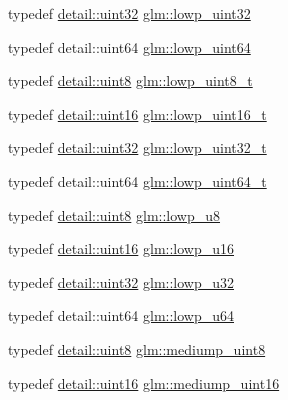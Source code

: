 \begin{DoxyCompactItemize}
\item 
typedef \hyperlink{stb__image_8c_a1134b580f8da4de94ca6b1de4d37975e}{detail\+::uint32} \hyperlink{group__gtc__type__precision_gaf11e85af414720b4cd12bd57b3a81e68}{glm\+::lowp\+\_\+uint32}
\item 
typedef detail\+::uint64 \hyperlink{group__gtc__type__precision_gacf666a9d9b309c4615c7a4f2ab0be289}{glm\+::lowp\+\_\+uint64}
\item 
typedef \hyperlink{stb__image_8c_adde6aaee8457bee49c2a92621fe22b79}{detail\+::uint8} \hyperlink{group__gtc__type__precision_ga0910ef24195d1b8b26e34d73148c0c45}{glm\+::lowp\+\_\+uint8\+\_\+t}
\item 
typedef \hyperlink{stb__image_8c_a05f6b0ae8f6a6e135b0e290c25fe0e4e}{detail\+::uint16} \hyperlink{group__gtc__type__precision_ga9a71176a4e5bc61951f9e9197d9c80e1}{glm\+::lowp\+\_\+uint16\+\_\+t}
\item 
typedef \hyperlink{stb__image_8c_a1134b580f8da4de94ca6b1de4d37975e}{detail\+::uint32} \hyperlink{group__gtc__type__precision_ga9f8cb602a358e1f48bda2682cf051f0c}{glm\+::lowp\+\_\+uint32\+\_\+t}
\item 
typedef detail\+::uint64 \hyperlink{group__gtc__type__precision_gabf3069d4f188557a87b1d7f35eb0a270}{glm\+::lowp\+\_\+uint64\+\_\+t}
\item 
typedef \hyperlink{stb__image_8c_adde6aaee8457bee49c2a92621fe22b79}{detail\+::uint8} \hyperlink{group__gtc__type__precision_gae63f942c49a30dbf266b2f13f3efe257}{glm\+::lowp\+\_\+u8}
\item 
typedef \hyperlink{stb__image_8c_a05f6b0ae8f6a6e135b0e290c25fe0e4e}{detail\+::uint16} \hyperlink{group__gtc__type__precision_ga22c5364f27caa0a6eb0627cbc21e46be}{glm\+::lowp\+\_\+u16}
\item 
typedef \hyperlink{stb__image_8c_a1134b580f8da4de94ca6b1de4d37975e}{detail\+::uint32} \hyperlink{group__gtc__type__precision_gaba06fae1dd98ca50c017e68345df0365}{glm\+::lowp\+\_\+u32}
\item 
typedef detail\+::uint64 \hyperlink{group__gtc__type__precision_ga61ed4c68a4cffb77cd63cc107119123a}{glm\+::lowp\+\_\+u64}
\item 
typedef \hyperlink{stb__image_8c_adde6aaee8457bee49c2a92621fe22b79}{detail\+::uint8} \hyperlink{group__gtc__type__precision_gac4b849eaac0543a10f97f4bdda4850a8}{glm\+::mediump\+\_\+uint8}
\item 
typedef \hyperlink{stb__image_8c_a05f6b0ae8f6a6e135b0e290c25fe0e4e}{detail\+::uint16} \hyperlink{group__gtc__type__precision_ga2cef3a0d7b0fce75c9885f64656d8933}{glm\+::mediump\+\_\+uint16}

\end{DoxyCompactItemize}
